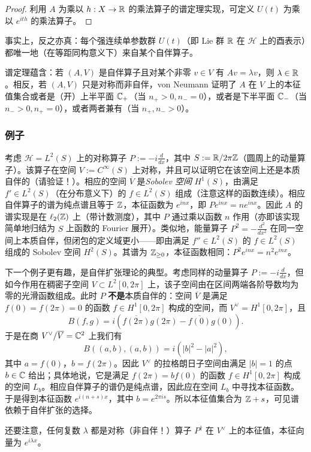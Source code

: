 \begin{proof} 利用 $A$ 为乘以 $h: X\to \Bbb R$ 的乘法算子的谱定理实现，可定义 $U(t)$ 为乘以 $e^{ith}$ 的乘法算子。
\end{proof}

事实上，反之亦真：每个强连续单参数群 $U(t)$（即 Lie 群 $\Bbb R$ 在 $\mathcal H$ 上的酉表示）都唯一地（在等距同构意义下）来自某个自伴算子。

\begin{remark} 谱定理蕴含：若 $(A,V)$ 是自伴算子且对某个非零 $v\in V$ 有 $Av=\lambda v$，则 $\lambda\in \Bbb R$。相反，若 $(A,V)$ 只是对称而非自伴，von Neumann 证明了 $A$ 在 $V$ 上的本征值集合或者是（开）上半平面 $\Bbb C_+$（当 $n_+>0,n_-=0$），或者是下半平面 $\Bbb C_-$（当 $n_->0,n_+=0$），或者两者兼有（当 $n_+,n_->0$）。
\end{remark}

\subsubsection{例子}

\begin{example} 考虑 $\mathcal H=L^2(S)$ 上的对称算子 $P:=-i\frac{d}{dx}$，其中 $S:=\Bbb R/2\pi \Bbb Z$（圆周上的动量算子）。该算子在空间 $V:=C^\infty(S)$ 上对称，并且可以证明它在该空间上还是本质自伴的（请验证！）。相应的空间 $\overline V$ 是\emph{Sobolev 空间} $H^1(S)$，由满足 $f'\in L^2(S)$（在分布意义下）的 $f\in L^2(S)$ 组成（注意这样的函数连续）。相应自伴算子的谱为纯点谱且等于 $\Bbb Z$，本征函数为 $e^{inx}$，即 $Pe^{inx}=ne^{inx}$。因此 $A$ 的谱实现是在 $\ell_2(\Bbb Z)$ 上（带计数测度），其中 $P$ 通过乘以函数 $n$ 作用（亦即该实现简单地归结为 $S$ 上函数的 Fourier 展开）。类似地，能量算子 $P^2=-\frac{d^2}{dx^2}$ 在同一空间上本质自伴，但闭包的定义域更小——即由满足 $f''\in L^2(S)$ 的 $f\in L^2(S)$ 组成的 Sobolev 空间 $H^2(S)$。其谱为 $\Bbb Z_{\ge 0}$，本征函数相同：$P^2e^{inx}=n^2e^{inx}$。
\end{example}

\begin{example} 下一个例子更有趣，是自伴扩张理论的典型。考虑同样的动量算子 $P:=-i\frac{d}{dx}$，但如今作用在稠密子空间 $V\subset L^2[0,2\pi]$ 上，该子空间由在区间两端各阶导数均为零的光滑函数组成。此时 $P$ \textbf{不是}本质自伴的：空间 $\overline V$ 是满足 $f(0)=f(2\pi)=0$ 的函数 $f\in H^1[0,2\pi]$ 构成的空间，而 $V^\vee=H^1[0,2\pi]$，且
$$
B(f,g)=i(\overline{f(2\pi)}g(2\pi)-\overline{f(0)}g(0)).
$$
于是在商 $V^\vee/\overline V=\Bbb C^2$ 上我们有
$$
B((a,b),(a,b))=i(|b|^2-|a|^2),
$$
其中 $a=f(0)$，$b=f(2\pi)$。因此 $V^\vee$ 的拉格朗日子空间由满足 $|b|=1$ 的点 $b\in \Bbb C$ 给出；具体地说，它是满足 $f(2\pi)=bf(0)$ 的函数 $f\in H^1[0,2\pi]$ 构成的空间 $L_b$。相应自伴算子的谱仍是纯点谱，因此应在空间 $L_b$ 中寻找本征函数。于是得到本征函数 $e^{i(n+s)x}$，其中 $b=e^{2\pi is}$。所以本征值集合为 $\Bbb Z+s$，可见谱依赖于自伴扩张的选择。

还要注意，任何复数 $\lambda$ 都是对称（非自伴！）算子 $P^\dagger$ 在 $V^\vee$ 上的本征值，本征向量为 $e^{i\lambda x}$。
\end{example}

